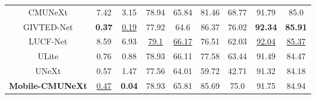 \begin{tabular}{ccc|cc|cc|cc}
CMUNeXt
& 7.42 & 3.15 	%
& 78.94 & 65.84 	%
& 81.46 & 68.77 	%
& 91.79 & 85.0 	%
\\

GIVTED-Net
& \textbf{0.37} & \underline{0.19} 	%
& 77.92 & 64.6 	%
& 86.37 & 76.02 	%
& \textbf{92.34} & \textbf{85.91} 	%
\\

LUCF-Net
& 8.59 & 6.93 	%
& \underline{79.1} & \underline{66.17} 	%
& 76.51 & 62.03 	%
& \underline{92.04} & \underline{85.37} 	%
\\

ULite
& 0.76 & 0.88 	%
& 78.93 & 66.11 	%
& 77.58 & 63.44 	%
& 91.49 & 84.47 	%
\\

\midrule[0.7pt]

UNeXt
& 0.57 & 1.47 	%
& 77.56 & 64.01 	%
& 59.72 & 42.71 	%
& 91.32 & 84.18 	%
\\

\midrule[0.7pt]

\textbf{Mobile-CMUNeXt}
& \underline{0.47} & \textbf{0.04} 	%
& 78.93 & 65.81 	%
& 85.69 & 75.0 	%
& 91.75 & 84.94 	%
\\

\bottomrule[1.1pt]
\end{tabular}